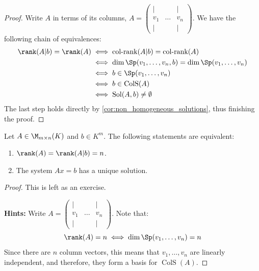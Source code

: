 \begin{proof}
Write $A$ in terms of its columns, $A = \begin{pmatrix} | & & | \\ v_1 & \dots & v_n \\ | & & | \end{pmatrix}$. We have the following chain of equivalences:
\begin{align*}
    \rank(A|b) = \rank(A) &\iff \operatorname{col-rank}(A|b) = \operatorname{col-rank}(A) \\
    &\iff \dim \Sp(v_1, \dots, v_n, b) = \dim \Sp(v_1, \dots, v_n) \\
    &\iff b \in \Sp(v_1, \dots, v_n) \\
    &\iff b \in \operatorname{ColS}(A) \\
    &\iff \operatorname{Sol}(A, b) \neq \emptyset
\end{align*}
The last step holds directly by \cref{cor:non_homogeneous_solutions}, thus finishing the proof.
\end{proof}

\begin{proposition}
\label{prop:unique_solution_rank_criterion}
Let $A \in \M_{m \times n}(K)$ and $b \in K^m$. The following statements are equivalent:
\begin{enumerate}
    \item $\rank(A) = \rank(A|b) = n$.
    \item The system $Ax = b$ has a unique solution.
\end{enumerate}
\end{proposition}

\begin{proof}
This is left as an exercise.

\textbf{Hints:} Write $A = \begin{pmatrix} | & & | \\ v_1 & \dots & v_n \\ | & & | \end{pmatrix}$. Note that:
\begin{equation*}
    \rank(A) = n \iff \dim \Sp(v_1, \dots, v_n) = n
\end{equation*}
Since there are $n$ column vectors, this means that $v_1, \dots, v_n$ are linearly independent, and therefore, they form a basis for $\operatorname{ColS}(A)$.
\end{proof}